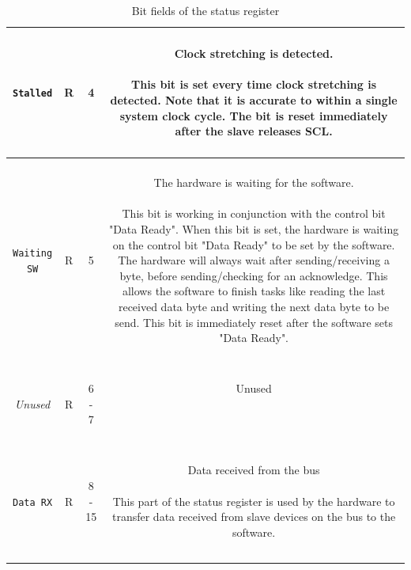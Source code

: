 \begin{longtable}[htb]{|c|c|c|c|}
\hline

\texttt{Stalled} & R & 4 &
\parbox{8,5cm}{ ~ \\ Clock stretching is detected. \\ ~ \\ \small
This bit is set every time clock stretching is detected.
Note that it is accurate to within a single system clock cycle.
The bit is reset immediately after the slave releases SCL.
\\ ~ } \\

\hline

\texttt{Waiting SW} & R & 5 &
\parbox{8,5cm}{ ~ \\ The hardware is waiting for the software. \\ ~ \\ \small
This bit is working in conjunction with the control bit "Data Ready".
When this bit is set, the hardware is waiting on the control bit "Data Ready" to be set by the software.
The hardware will always wait after sending/receiving a byte, before sending/checking for an acknowledge.
This allows the software to finish tasks like reading the last received data byte and writing the next data byte to be send.
This bit is immediately reset after the software sets "Data Ready".
\\ ~ } \\

\hline

\textit{Unused} & R & 6 - 7 &
\parbox{8,5cm}{ ~ \\ Unused \\ ~ \\ \small
\\ ~ } \\

\hline

\texttt{Data RX} & R & 8 - 15 &
\parbox{8,5cm}{ ~ \\ Data received from the bus \\ ~ \\ \small
This part of the status register is used by the hardware to transfer data received from slave devices on the bus to the software.
\\ ~ } \\

\hline


\caption{Bit fields of the status register}
\label{07-05-as-iic-status-bits}
\end{longtable}

